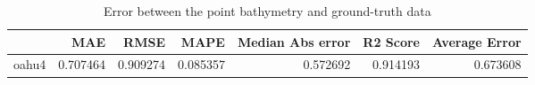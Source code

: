 \begin{table}[h!]
\caption{Error between the point bathymetry and ground-truth data}
\label{tab:oahu4_lidar_error}
\begin{tabular}{lrrrrrr}
\toprule
 & MAE & RMSE & MAPE & Median Abs error & R2 Score & Average Error \\
\midrule
oahu4 & 0.707464 & 0.909274 & 0.085357 & 0.572692 & 0.914193 & 0.673608 \\
\bottomrule
\end{tabular}
\end{table}
